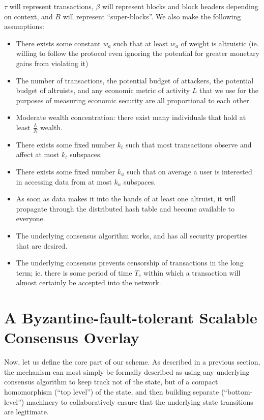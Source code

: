 \documentclass[11pt,a4paper]{article}
\theoremstyle{plain}
\theoremstyle{definition}
\theoremstyle{remark}
\begin{document}
$\tau$ will represent transactions, $\beta$ will represent blocks and block headers depending on context, and $B$ will represent ``super-blocks''. We also make the following assumptions:

\begin{itemize}
\item
There exists some constant $w_a$ such that at least $w_a$ of weight is altruistic (ie. willing to follow the protocol even ignoring the potential for greater monetary gains from violating it)
\item
The number of transactions, the potential budget of attackers, the potential budget of altruists, and any economic metric of activity $L$ that we use for the purposes of measuring economic security are all proportional to each other.
\item
Moderate wealth concentration: there exist many individuals that hold at least $\frac{L}{N}$ wealth.
\item
There exists some fixed number $k_t$ such that most transactions observe and affect at most $k_t$ subspaces.
\item
There exists some fixed number $k_u$ such that on average a user is interested in accessing data from at most $k_u$ subspaces.
\item
As soon as data makes it into the hands of at least one altruist, it will propagate through the distributed hash table and become available to everyone.
\item
The underlying consensus algorithm works, and has all security properties that are desired.
\item
The underlying consensus prevents censorship of transactions in the long term; ie. there is some period of time $T_c$ within which a transaction will almost certainly be accepted into the network.
\end{itemize}

\section{A Byzantine-fault-tolerant Scalable Consensus Overlay}

Now, let us define the core part of our scheme. As described in a previous section, the mechanism can most simply be formally described as using any underlying consensus algorithm to keep track not of the state, but of a compact homomorphism (``top level'') of the state, and then building separate (``bottom-level'') machinery to collaboratively ensure that the underlying state transitions are legitimate.
\end{document}
